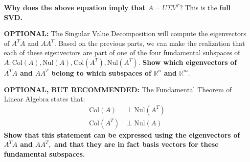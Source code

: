 \begin{enumerate}[resume]
  \qitem \textbf{Why does the above equation imply that $A = U \Sigma V^{T}?$} This is the \textbf{full SVD.}

  \ws{\vspace{50px}}


  \newpage

  \qitem \textbf{OPTIONAL:} The Singular Value Decomposition will compute the eigenvectors of $A^{T} A$ and $AA^{T}.$
  Based on the previous parts, we can make the realization that each of these eigenvectors are part of one of the four fundamental subspaces of $A: \text{Col}(A), \text{Nul}(A), \text{Col}(A^{T}), \text{Nul}(A^{T}).$
  \textbf{Show which eigenvectors of $A^{T} A$ and $AA^{T}$ belong to which subspaces of $\mathbb{R}^{n}$ and $\mathbb{R}^{m}.$}

  \ws{\vspace{100px}}


  \qitem \textbf{OPTIONAL, BUT RECOMMENDED:} The Fundamental Theorem of Linear Algebra states that:
  \begin{align*}
    \text{Col}(A) &\perp \text{Nul}(A^{T}) \\
    \text{Col}(A^{T}) &\perp \text{Nul}(A)
  \end{align*}
  \textbf{Show that this statement can be expressed using the eigenvectors of $A^{T}A$ and $AA^{T},$ and that they are in fact basis vectors for these fundamental subspaces.}


\end{enumerate}

